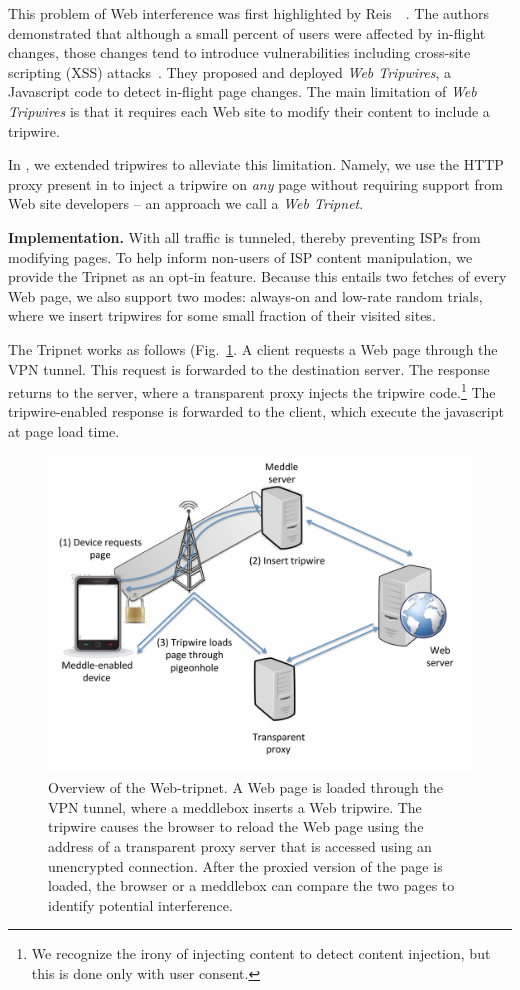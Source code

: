 This problem of Web interference was first highlighted by Reis~\etal~\cite{reis:tripwires}. 
The authors demonstrated that although a small percent of users were affected by in-flight changes, those changes tend to introduce vulnerabilities including cross-site scripting (XSS) attacks~\cite{reis:tripwires}. 
They proposed and deployed \emph{Web Tripwires}, a Javascript code to detect in-flight page changes. 
The main limitation of \emph{Web Tripwires} is that it requires each Web site to modify their content to include a tripwire.

In \meddle, we extended tripwires to alleviate this limitation. 
Namely, we use the HTTP proxy present in \meddle to inject a tripwire on \emph{any} page 
without requiring support from Web site developers -- an approach we call a \emph{Web Tripnet}.

\noindent\textbf{Implementation.} With \meddle all traffic is tunneled, thereby 
preventing ISPs from modifying pages. To help inform non-users of ISP content 
manipulation, we provide the Tripnet as an opt-in feature. Because this entails 
two fetches of every Web page, we also support two modes: always-on and low-rate random trials, where we 
insert tripwires for some small fraction of their visited sites.

The Tripnet works as follows (Fig.~\ref{fig:tripnet}. A client requests a Web page through the \meddle VPN 
tunnel. This request is forwarded to the destination server. The response returns to 
the \meddle server, where a transparent proxy injects the tripwire code.\footnote{We 
recognize the irony of injecting content to detect content injection, but this is done only with user consent.}
The tripwire-enabled response is forwarded to the client, which execute the javascript at page load time.


\begin{figure}
\centering
\includegraphics[width=0.9\linewidth]{figures/tripnet.pdf}
\caption{Overview of the \meddle Web-tripnet. A Web page is loaded
through the VPN tunnel, where a meddlebox inserts a Web tripwire. The
tripwire causes the browser to reload the Web page using the address of a
transparent proxy server that is accessed using an unencrypted connection.
After the proxied version of the page is loaded, the browser or a meddlebox
can compare the two pages to identify potential interference. }
\label{fig:tripnet}
\end{figure}

